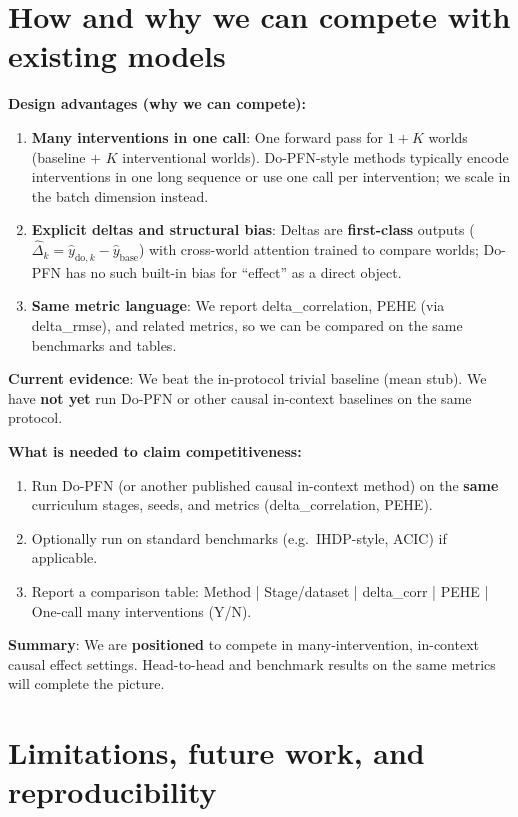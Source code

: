 \documentclass[12pt]{article}
\begin{document}
\section{How and why we can compete with existing models}

\textbf{Design advantages (why we can compete):}

\begin{enumerate}
    \item \textbf{Many interventions in one call}: One forward pass for $1 + K$ worlds (baseline $+$ $K$ interventional worlds). Do-PFN-style methods typically encode interventions in one long sequence or use one call per intervention; we scale in the batch dimension instead.
    \item \textbf{Explicit deltas and structural bias}: Deltas are \textbf{first-class} outputs ($\hat{\Delta}_k = \hat{y}_{\text{do},k} - \hat{y}_{\text{base}}$) with cross-world attention trained to compare worlds; Do-PFN has no such built-in bias for ``effect'' as a direct object.
    \item \textbf{Same metric language}: We report delta\_correlation, PEHE (via delta\_rmse), and related metrics, so we can be compared on the same benchmarks and tables.
\end{enumerate}

\textbf{Current evidence}: We beat the in-protocol trivial baseline (mean stub). We have \textbf{not yet} run Do-PFN or other causal in-context baselines on the same protocol.

\textbf{What is needed to claim competitiveness:}

\begin{enumerate}
    \item Run Do-PFN (or another published causal in-context method) on the \textbf{same} curriculum stages, seeds, and metrics (delta\_correlation, PEHE).
    \item Optionally run on standard benchmarks (e.g.\ IHDP-style, ACIC) if applicable.
    \item Report a comparison table: Method | Stage/dataset | delta\_corr | PEHE | One-call many interventions (Y/N).
\end{enumerate}

\textbf{Summary}: We are \textbf{positioned} to compete in many-intervention, in-context causal effect settings. Head-to-head and benchmark results on the same metrics will complete the picture.

\section{Limitations, future work, and reproducibility}
\end{document}
